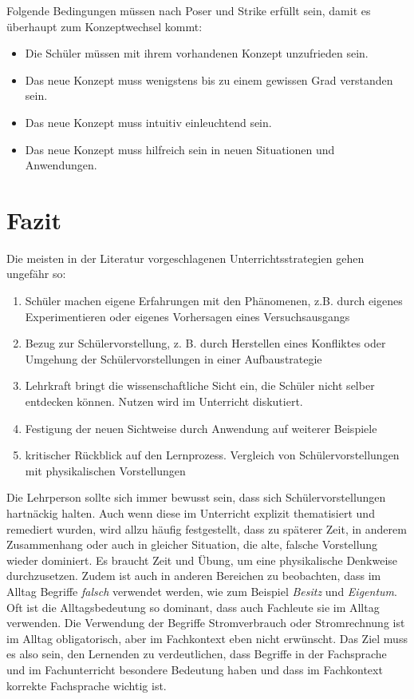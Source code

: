Folgende Bedingungen m{\"u}ssen nach Poser und Strike erf{\"u}llt sein, damit es {\"u}berhaupt zum Konzeptwechsel kommt:

\begin{itemize}
\item Die Schüler m{\"u}ssen mit ihrem vorhandenen Konzept unzufrieden sein.
\item Das neue Konzept muss wenigstens bis zu einem gewissen Grad verstanden sein.
\item Das neue Konzept muss intuitiv einleuchtend sein.
\item Das neue Konzept muss hilfreich sein in neuen Situationen und Anwendungen.
\end{itemize}

\bip\bip
\section{Fazit}
Die meisten in der Literatur vorgeschlagenen Unterrichtsstrategien gehen ungef{\"a}hr so:

\begin{enumerate}
	\item 
	Schüler machen eigene Erfahrungen mit den Ph{\"a}nomenen, z.B. durch eigenes Experimentieren oder eigenes Vorhersagen eines Versuchsausgangs
	\item  
	Bezug zur Sch{\"u}lervorstellung, z. B. durch Herstellen eines Konfliktes oder Umgehung der Sch{\"u}lervorstellungen in einer Aufbaustrategie
	\item
	Lehrkraft bringt die wissenschaftliche Sicht ein, die Schüler nicht selber entdecken k{\"o}nnen. Nutzen wird im Unterricht diskutiert.
	\item
	Festigung der neuen Sichtweise durch Anwendung auf weiterer Beispiele
	\item
	kritischer R{\"u}ckblick auf den Lernprozess. Vergleich von Sch{\"u}lervorstellungen mit physikalischen Vorstellungen
\end{enumerate}

Die Lehrperson sollte sich immer bewusst sein, dass sich Sch\"{u}lervorstellungen hartn\"{a}ckig halten. Auch wenn diese im Unterricht explizit thematisiert und remediert wurden, wird allzu h\"{a}ufig festgestellt, dass zu sp\"{a}terer Zeit, in anderem Zusammenhang oder auch in gleicher Situation, die alte, falsche Vorstellung wieder dominiert. Es braucht Zeit und \"{U}bung, um eine physikalische Denkweise durchzusetzen.
Zudem ist auch in anderen Bereichen zu beobachten, dass im Alltag Begriffe \emph{falsch} verwendet werden, wie zum Beispiel \emph{Besitz} und \emph{Eigentum}. Oft ist die Alltagsbedeutung so dominant, dass auch Fachleute sie im Alltag verwenden. Die Verwendung der Begriffe Stromverbrauch oder Stromrechnung ist im Alltag obligatorisch, aber im Fachkontext eben nicht erw\"{u}nscht. Das Ziel muss es also sein, den Lernenden zu verdeutlichen, dass Begriffe in der Fachsprache und im Fachunterricht besondere Bedeutung haben und dass im Fachkontext korrekte Fachsprache wichtig ist. 


